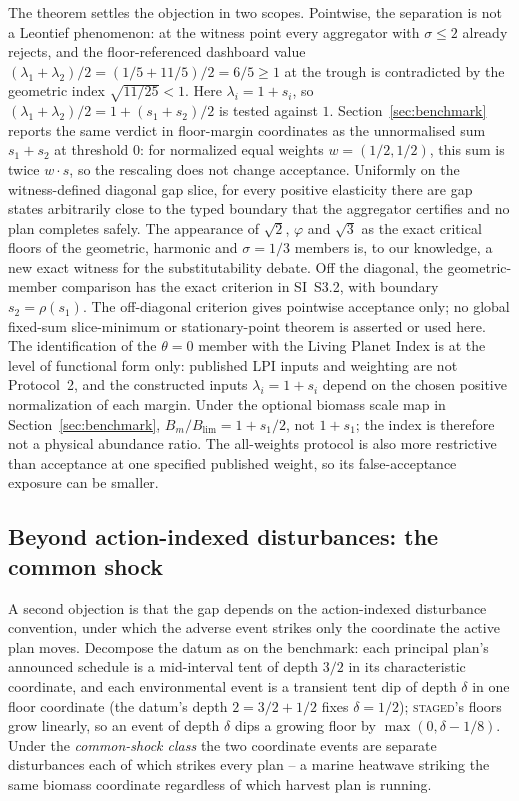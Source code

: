 \documentclass[preprint,11pt,authoryear]{elsarticle}
\theoremstyle{definition}
\theoremstyle{remark}
\newcommand{\act}[1]{\textsc{#1}}
\begin{document}
The theorem settles the objection in two scopes. Pointwise, the separation is not a Leontief phenomenon: at the witness point every aggregator with $\sigma\le2$ already rejects, and the floor-referenced dashboard value $(\lambda_1+\lambda_2)/2=(1/5+11/5)/2=6/5\ge1$ at the trough is contradicted by the geometric index $\sqrt{11/25}<1$. Here $\lambda_i=1+s_i$, so $(\lambda_1+\lambda_2)/2=1+(s_1+s_2)/2$ is tested against $1$. Section~\ref{sec:benchmark} reports the same verdict in floor-margin coordinates as the unnormalised sum $s_1+s_2$ at threshold $0$: for normalized equal weights $w=(1/2,1/2)$, this sum is twice $w\cdot s$, so the rescaling does not change acceptance. Uniformly on the witness-defined diagonal gap slice, for every positive elasticity there are gap states arbitrarily close to the typed boundary that the aggregator certifies and no plan completes safely. The appearance of $\sqrt2$, $\varphi$ and $\sqrt3$ as the exact critical floors of the geometric, harmonic and $\sigma=1/3$ members is, to our knowledge, a new exact witness for the substitutability debate. Off the diagonal, the geometric-member comparison has the exact criterion in SI~S3.2, with boundary $s_2=\rho(s_1)$. The off-diagonal criterion gives pointwise acceptance only; no global fixed-sum slice-minimum or stationary-point theorem is asserted or used here. The identification of the $\theta=0$ member with the Living Planet Index is at the level of functional form only: published LPI inputs and weighting are not Protocol~2, and the constructed inputs $\lambda_i=1+s_i$ depend on the chosen positive normalization of each margin. Under the optional biomass scale map in Section~\ref{sec:benchmark}, $B_m/B_{\mathrm{lim}}=1+s_1/2$, not $1+s_1$; the index is therefore not a physical abundance ratio. The all-weights protocol is also more restrictive than acceptance at one specified published weight, so its false-acceptance exposure can be smaller.

\subsection{Beyond action-indexed disturbances: the common shock}\label{sec:commonshock}

A second objection is that the gap depends on the action-indexed disturbance convention, under which the adverse event strikes only the coordinate the active plan moves. Decompose the datum as on the benchmark: each principal plan's announced schedule is a mid-interval tent of depth $3/2$ in its characteristic coordinate, and each environmental event is a transient tent dip of depth $\delta$ in one floor coordinate (the datum's depth $2=3/2+1/2$ fixes $\delta=1/2$); \act{staged}'s floors grow linearly, so an event of depth $\delta$ dips a growing floor by $\max(0,\delta-1/8)$. Under the \emph{common-shock class} the two coordinate events are separate disturbances each of which strikes every plan -- a marine heatwave striking the same biomass coordinate regardless of which harvest plan is running.
\end{document}
